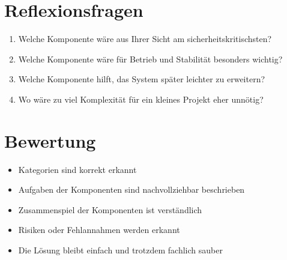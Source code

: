 \documentclass[a4paper,12pt]{article}
\begin{document}
\section*{Reflexionsfragen}

\begin{enumerate}
\item Welche Komponente wäre aus Ihrer Sicht am sicherheitskritischsten?
\item Welche Komponente wäre für Betrieb und Stabilität besonders wichtig?
\item Welche Komponente hilft, das System später leichter zu erweitern?
\item Wo wäre zu viel Komplexität für ein kleines Projekt eher unnötig?
\end{enumerate}

\section*{Bewertung}

\begin{itemize}
\item Kategorien sind korrekt erkannt
\item Aufgaben der Komponenten sind nachvollziehbar beschrieben
\item Zusammenspiel der Komponenten ist verständlich
\item Risiken oder Fehlannahmen werden erkannt
\item Die Lösung bleibt einfach und trotzdem fachlich sauber
\end{itemize}
\end{document}
